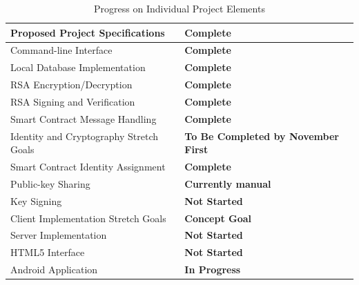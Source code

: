 \documentclass[titlepage]{report}
\begin{document}
\begin{table}[ht]
\begin{center}
\caption{Progress on Individual Project Elements}
\begin{tabular}{| l | p{5cm} |}
\hline
Proposed Project Specifications & \textbf{Complete} \\
\hline
Command-line Interface & \textbf{Complete} \\
Local Database Implementation & \textbf{Complete} \\
RSA\index{RSA} Encryption/Decryption & \textbf{Complete} \\
RSA\index{RSA} Signing and Verification & \textbf{Complete} \\
Smart Contract Message Handling & \textbf{Complete} \\
\hline
Identity and Cryptography Stretch Goals & \textbf{To Be Completed by November First} \\
\hline
Smart Contract Identity Assignment & \textbf{Complete} \\
Public-key Sharing & \textbf{Currently manual} \\
Key Signing & \textbf{Not Started} \\
\hline
Client Implementation Stretch Goals & \textbf{Concept Goal} \\
\hline
Server Implementation & \textbf{Not Started} \\
HTML5 Interface & \textbf{Not Started} \\
Android Application & \textbf{In Progress} \\
\hline
\end{tabular}
\end{center}
\end{table}

\listoftables
\listoffigures
\printindex
\printglossaries{}
\printbibliography{}
\end{document}
